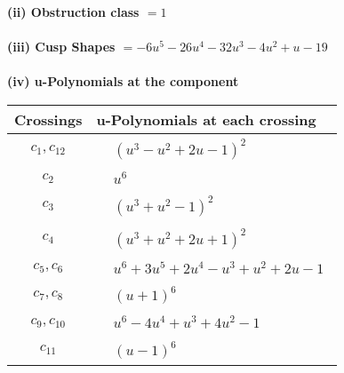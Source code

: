 \documentclass[1p]{elsarticle_modified}
\theoremstyle{definition}
\begin{document}
\flushleft \textbf{(ii) Obstruction class $= 1$}\\~\\
\flushleft \textbf{(iii) Cusp Shapes $= -6 u^5-26 u^4-32 u^3-4 u^2+u-19$}\\~\\
\newpage\renewcommand{\arraystretch}{1}
\flushleft \textbf{(iv) u-Polynomials at the component}\newline \\
\begin{tabular}{m{50pt}|m{274pt}}
Crossings & \hspace{64pt}u-Polynomials at each crossing \\
\hline $$\begin{aligned}c_{1},c_{12}\end{aligned}$$&$\begin{aligned}
&(u^3- u^2+2 u-1)^2
\end{aligned}$\\
\hline $$\begin{aligned}c_{2}\end{aligned}$$&$\begin{aligned}
&u^6
\end{aligned}$\\
\hline $$\begin{aligned}c_{3}\end{aligned}$$&$\begin{aligned}
&(u^3+u^2-1)^2
\end{aligned}$\\
\hline $$\begin{aligned}c_{4}\end{aligned}$$&$\begin{aligned}
&(u^3+u^2+2 u+1)^2
\end{aligned}$\\
\hline $$\begin{aligned}c_{5},c_{6}\end{aligned}$$&$\begin{aligned}
&u^6+3 u^5+2 u^4- u^3+u^2+2 u-1
\end{aligned}$\\
\hline $$\begin{aligned}c_{7},c_{8}\end{aligned}$$&$\begin{aligned}
&(u+1)^6
\end{aligned}$\\
\hline $$\begin{aligned}c_{9},c_{10}\end{aligned}$$&$\begin{aligned}
&u^6-4 u^4+u^3+4 u^2-1
\end{aligned}$\\
\hline $$\begin{aligned}c_{11}\end{aligned}$$&$\begin{aligned}
&(u-1)^6
\end{aligned}$\\
\hline
\end{tabular}\\~\\
\end{document}
